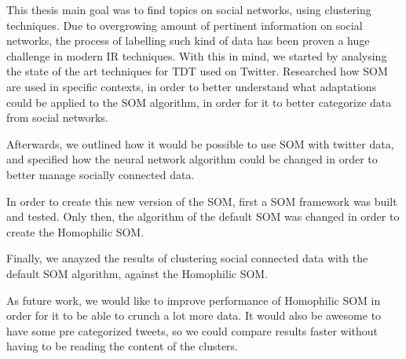 \label{ch:conclusions}
This thesis main goal was to find topics on social networks, using clustering techniques. Due to overgrowing amount of pertinent information on social networks, the process of labelling such kind of data has been proven a huge challenge in modern \ac{IR} techniques. 
With this in mind, we started by analysing the state of the art techniques for \ac{TDT} used on Twitter. Researched how \ac{SOM} are used in specific contexts, in order to better understand what adaptations could be applied to the \ac{SOM} algorithm, in order for it to better categorize data from social networks.

Afterwards, we outlined how it would be possible to use \ac{SOM} with twitter data, and specified how the neural network algorithm could be changed in order to better manage socially connected data. 

In order to create this new version of the \ac{SOM}, first a \ac{SOM} framework was built and tested. Only then, the algorithm of the default \ac{SOM} was changed in order to create the Homophilic SOM.

Finally, we anayzed the results of clustering social connected data with the default \ac{SOM} algorithm, against the Homophilic SOM.

As future work, we would like to improve performance of Homophilic \ac{SOM} in order for it to be able to crunch a lot more data. It would also be awesome to have some pre categorized tweets, so we could compare results faster without having to be reading the content of the clusters.

\cleardoublepage
 
